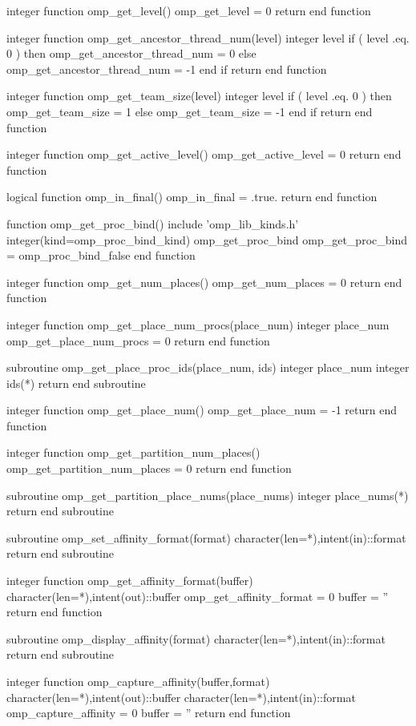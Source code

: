 {\begin{ompfFunction}
integer function omp_get_level()
  omp_get_level = 0
  return
end function

integer function omp_get_ancestor_thread_num(level)
  integer level
  if ( level .eq. 0 ) then
     omp_get_ancestor_thread_num = 0
  else
     omp_get_ancestor_thread_num = -1
  end if
  return
end function

integer function omp_get_team_size(level)
  integer level
  if ( level .eq. 0 ) then
     omp_get_team_size = 1
  else
     omp_get_team_size = -1
  end if
  return
end function

integer function omp_get_active_level()
  omp_get_active_level = 0
  return
end function

logical function omp_in_final()
  omp_in_final = .true.
  return
end function

function omp_get_proc_bind()
  include 'omp_lib_kinds.h'
  integer(kind=omp_proc_bind_kind) omp_get_proc_bind
  omp_get_proc_bind = omp_proc_bind_false
end function

integer function omp_get_num_places()
  omp_get_num_places = 0
  return
end function

integer function omp_get_place_num_procs(place_num)
  integer place_num
  omp_get_place_num_procs = 0
  return
end function

subroutine omp_get_place_proc_ids(place_num, ids)
  integer place_num
  integer ids(*)
  return
end subroutine

integer function omp_get_place_num()
  omp_get_place_num = -1
  return
end function

integer function omp_get_partition_num_places()
  omp_get_partition_num_places = 0
  return
end function

subroutine omp_get_partition_place_nums(place_nums)
  integer place_nums(*)
  return
end subroutine


subroutine omp_set_affinity_format(format)
  character(len=*),intent(in)::format
  return
end subroutine

integer function omp_get_affinity_format(buffer)
  character(len=*),intent(out)::buffer
  omp_get_affinity_format = 0
  buffer = ''
  return
end function

subroutine omp_display_affinity(format)
  character(len=*),intent(in)::format
  return
end subroutine

integer function omp_capture_affinity(buffer,format)
  character(len=*),intent(out)::buffer
  character(len=*),intent(in)::format
  omp_capture_affinity = 0
  buffer = ''
  return
end function


\end{ompfFunction}}
